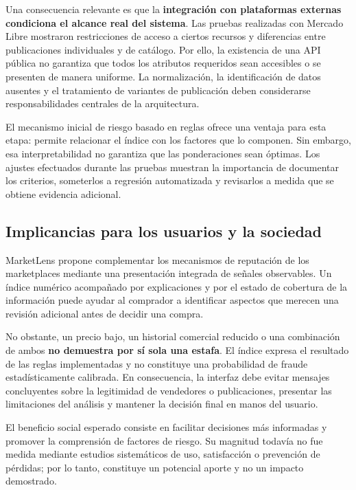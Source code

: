 Una consecuencia relevante es que la \textbf{integración con plataformas externas condiciona el alcance real del sistema}. Las pruebas realizadas con Mercado Libre mostraron restricciones de acceso a ciertos recursos y diferencias entre publicaciones individuales y de catálogo. Por ello, la existencia de una API pública no garantiza que todos los atributos requeridos sean accesibles o se presenten de manera uniforme. La normalización, la identificación de datos ausentes y el tratamiento de variantes de publicación deben considerarse responsabilidades centrales de la arquitectura.

El mecanismo inicial de riesgo basado en reglas ofrece una ventaja para esta etapa: permite relacionar el índice con los factores que lo componen. Sin embargo, esa interpretabilidad no garantiza que las ponderaciones sean óptimas. Los ajustes efectuados durante las pruebas muestran la importancia de documentar los criterios, someterlos a regresión automatizada y revisarlos a medida que se obtiene evidencia adicional.

\subsection{Implicancias para los usuarios y la sociedad}\label{subsec:ml-implicancias-usuarios}

MarketLens propone complementar los mecanismos de reputación de los marketplaces mediante una presentación integrada de señales observables. Un índice numérico acompañado por explicaciones y por el estado de cobertura de la información puede ayudar al comprador a identificar aspectos que merecen una revisión adicional antes de decidir una compra.

No obstante, un precio bajo, un historial comercial reducido o una combinación de ambos \textbf{no demuestra por sí sola una estafa}. El índice expresa el resultado de las reglas implementadas y no constituye una probabilidad de fraude estadísticamente calibrada. En consecuencia, la interfaz debe evitar mensajes concluyentes sobre la legitimidad de vendedores o publicaciones, presentar las limitaciones del análisis y mantener la decisión final en manos del usuario.

El beneficio social esperado consiste en facilitar decisiones más informadas y promover la comprensión de factores de riesgo. Su magnitud todavía no fue medida mediante estudios sistemáticos de uso, satisfacción o prevención de pérdidas; por lo tanto, constituye un potencial aporte y no un impacto demostrado.

